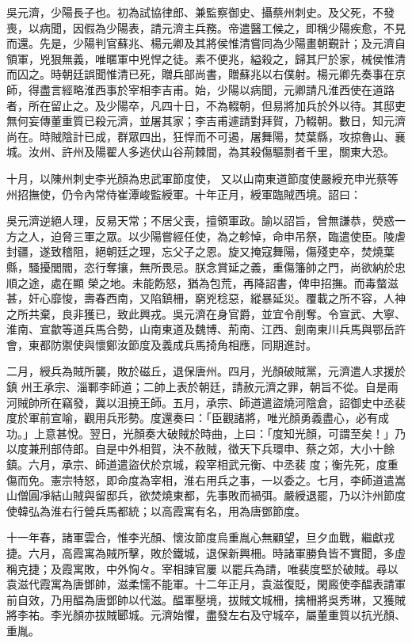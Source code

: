 \begin{pinyinscope}
 吳元濟，少陽長子也。初為試協律郎、兼監察御史、攝蔡州刺史。及父死，不發喪，以病聞，因假為少陽表，請元濟主兵務。帝遣醫工候之，即稱少陽疾愈，不見而還。先是，少陽判官蘇兆、楊元卿及其將侯惟清嘗同為少陽畫朝覲計；及元濟自領軍，兇狠無義，唯暱軍中兇悍之徒。素不便兆，縊殺之，歸其尸於家，械侯惟清而囚之。時朝廷誤聞惟清已死，贈兵部尚書，贈蘇兆以右僕射。楊元卿先奏事在京
 師，得盡言經略淮西事於宰相李吉甫。始，少陽以病聞，元卿請凡淮西使在道路者，所在留止之。及少陽卒，凡四十日，不為輟朝，但易將加兵於外以待。其邸吏無何妄傳董重質已殺元濟，並屠其家；李吉甫遽請對拜賀，乃輟朝。數日，知元濟尚在。時賊陰計已成，群眾四出，狂悍而不可遏，屠舞陽，焚葉縣，攻掠魯山、襄城。汝州、許州及陽翟人多逃伏山谷荊棘間，為其殺傷驅剽者千里，關東大恐。



 十月，以陳州刺史李光顏為忠武軍節度使，
 又以山南東道節度使嚴綬充申光蔡等州招撫使，仍令內常侍崔潭峻監綬軍。十年正月，綬軍臨賊西境。詔曰：



 吳元濟逆絕人理，反易天常；不居父喪，擅領軍政。諭以詔旨，曾無謙恭，熒惑一方之人，迫脅三軍之眾。以少陽嘗經任使，為之軫悼，命申吊祭，臨遣使臣。陵虐封疆，遂致稽阻，絕朝廷之理，忘父子之恩。旋又掩寇舞陽，傷殘吏卒，焚燒葉縣，騷擾閭閻，恣行奪攘，無所畏忌。朕念賞延之義，重傷籓帥之門，尚欲納於忠順之途，處在顯
 榮之地。未能飭怒，猶為包荒，再降詔書，俾申招撫。而毒螫滋甚，奸心靡悛，壽春西南，又陷鎮柵，窮兇稔惡，縱暴延災。覆載之所不容，人神之所共棄，良非獲已，致此興戎。吳元濟在身官爵，並宜令削奪。令宣武、大寧、淮南、宣歙等道兵馬合勢，山南東道及魏博、荊南、江西、劍南東川兵馬與鄂岳許會，東都防禦使與懷鄭汝節度及義成兵馬掎角相應，同期進討。



 二月，綬兵為賊所襲，敗於磁丘，退保唐州。四月，光顏破賊黨，元濟遣人求援於鎮
 州王承宗、淄鄆李師道；二帥上表於朝廷，請赦元濟之罪，朝旨不從。自是兩河賊帥所在竊發，冀以沮撓王師。五月，承宗、師道遣盜燒河陰倉，詔御史中丞裴度於軍前宣喻，觀用兵形勢。度還奏曰：「臣觀諸將，唯光顏勇義盡心，必有成功。」上意甚悅。翌日，光顏奏大破賊於時曲，上曰：「度知光顏，可謂至矣！」乃以度兼刑部侍郎。自是中外相賀，決不赦賊，徵天下兵環申、蔡之郊，大小十餘鎮。六月，承宗、師道遣盜伏於京城，殺宰相武元衡、中丞裴
 度；衡先死，度重傷而免。憲宗特怒，即命度為宰相，淮右用兵之事，一以委之。七月，李師道遣嵩山僧圓凈結山賊與留邸兵，欲焚燒東都，先事敗而禍弭。嚴綬退罷，乃以汴州節度使韓弘為淮右行營兵馬都統；以高霞寓有名，用為唐鄧節度。



 十一年春，諸軍雲合，惟李光顏、懷汝節度烏重胤心無顧望，旦夕血戰，繼獻戎捷。六月，高霞寓為賊所擊，敗於鐵城，退保新興柵。時諸軍勝負皆不實聞，多虛稱克捷；及霞寓敗，中外恟々。宰相諫官屢
 以罷兵為請，唯裴度堅於破賊。尋以袁滋代霞寓為唐鄧帥，滋柔懦不能軍。十二年正月，袁滋復貶，閑廄使李醖表請軍前自效，乃用醖為唐鄧帥以代滋。醖軍壓境，拔賊文城柵，擒柵將吳秀琳，又獲賊將李祐。李光顏亦拔賊郾城。元濟始懼，盡發左右及守城卒，屬董重質以抗光顏、重胤。




\end{pinyinscope}
